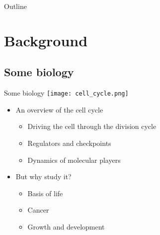 





\begin{frame}
  \titlepage
\end{frame}

\begin{frame}{Outline}
  \tableofcontents
\end{frame}

\section{Background}

\subsection{Some biology}
\begin{frame}{Some biology}
\texttt{[image: cell\_cycle.png]}
  \begin{itemize} 
\item An overview of the cell cycle 
\begin{itemize}
  \item{    Driving the cell through the division cycle  }
  \item{Regulators and checkpoints}
  \item{   Dynamics of molecular players}
  \end{itemize}
\item But why study it?	

\begin{itemize}
  \item{  Basis of life}

  \item{  Cancer}

  \item{  Growth and development}
\end{itemize}
\end{itemize}
\end{frame}
